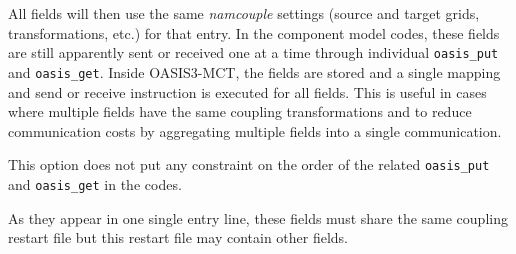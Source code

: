 All fields will then use the same
{\it namcouple} settings (source and target grids, transformations, etc.) for that entry. In the component model codes,
these fields are still apparently sent or received one at a
time through individual {\tt oasis\_put} and {\tt oasis\_get}. Inside OASIS3-MCT, the fields are stored and a single mapping
and send or receive instruction is executed for all fields. This is
useful in cases where multiple fields have the same coupling
transformations and to reduce communication costs by aggregating multiple
fields into a single communication.

This option does not put any constraint
on the order of the related {\tt oasis\_put} and {\tt oasis\_get} in the codes.

As they appear in one single entry line, these fields must share the same coupling restart file
but this restart file may contain other fields.

